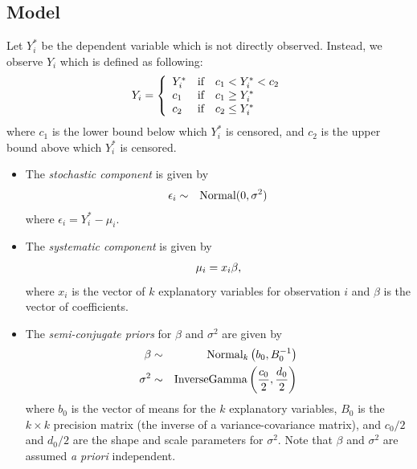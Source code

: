 \documentclass[letterpaper,10pt,english]{sphinxmanual}
\begin{document}
\subsection{Model}
\label{vignette:id123}
Let \(Y_i^*\) be the dependent variable which is not directly
observed. Instead, we observe \(Y_i\) which is defined as following:
\begin{gather}
\begin{split}Y_i = \left\{
\begin{array}{lcl}
Y_i^*  &\textrm{if} & c_1<Y_i^*<c_2 \\
c_1    &\textrm{if} & c_1 \ge Y_i^* \\
c_2    &\textrm{if} & c_2 \le Y_i^*
\end{array}\right.\end{split}\notag
\end{gather}
where \(c_1\) is the lower bound below which \(Y_i^*\) is
censored, and \(c_2\) is the upper bound above which \(Y_i^*\)
is censored.
\begin{itemize}
\item {} 
The \emph{stochastic component} is given by
\begin{gather}
\begin{split}\begin{aligned}
\epsilon_{i}  &  \sim & \textrm{Normal}(0, \sigma^2)\end{aligned}\end{split}\notag
\end{gather}
where \(\epsilon_{i}=Y^*_i-\mu_i\).

\item {} 
The \emph{systematic component} is given by
\begin{gather}
\begin{split}\begin{aligned}
\mu_{i}= x_{i} \beta,\end{aligned}\end{split}\notag
\end{gather}
where \(x_{i}\) is the vector of \(k\) explanatory variables
for observation \(i\) and \(\beta\) is the vector of
coefficients.

\item {} 
The \emph{semi-conjugate priors} for \(\beta\) and \(\sigma^2\)
are given by
\begin{gather}
\begin{split}\begin{aligned}
\beta & \sim & \textrm{Normal}_k \left( b_{0},B_{0}^{-1}\right) \\
\sigma^{2} & \sim & \textrm{InverseGamma} \left( \frac{c_0}{2}, \frac{d_0}{2}
\right) \end{aligned}\end{split}\notag
\end{gather}
where \(b_{0}\) is the vector of means for the \(k\)
explanatory variables, \(B_{0}\) is the \(k\times k\)
precision matrix (the inverse of a variance-covariance matrix), and
\(c_0/2\) and \(d_0/2\) are the shape and scale parameters
for \(\sigma^{2}\). Note that \(\beta\) and \(\sigma^2\)
are assumed \emph{a priori} independent.

\end{itemize}
\end{document}
